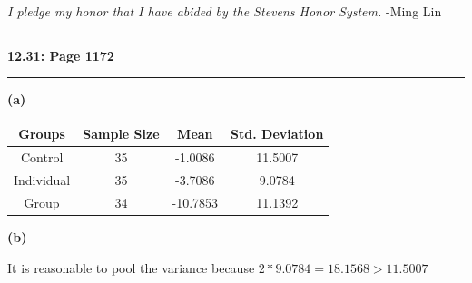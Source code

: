 \documentclass[11pt]{article}
\newcommand\question[2]{\vspace{.25in}\hrule\textbf{#1: #2}\vspace{.5em}\hrule\vspace{.10in}}
\renewcommand\part[1]{\vspace{.10in}\textbf{(#1)}\par}
\begin{document}
\raggedright
\newcommand\NAME{Ming Lin}  %
\newcommand\COURSE{MA-331}
\newcommand\HWNUM{7}              %


\textit{I pledge my honor that I have abided by the Stevens Honor System.} -Ming Lin

\question{12.31}{Page 1172}
	\part{a}
		\begin{tabular}{|c|c|c|c|}
			\hline
			Groups & Sample Size & Mean & Std. Deviation\\
			\hline
			Control & 35 & -1.0086 & 11.5007\\
			\hline
			Individual & 35 & -3.7086 & 9.0784\\
			\hline
			Group & 34 & -10.7853 & 11.1392\\
			\hline
		\end{tabular}
	
	\part{b}
		It is reasonable to pool the variance because $2 * 9.0784 = 18.1568 > 11.5007$\par
\end{document}
